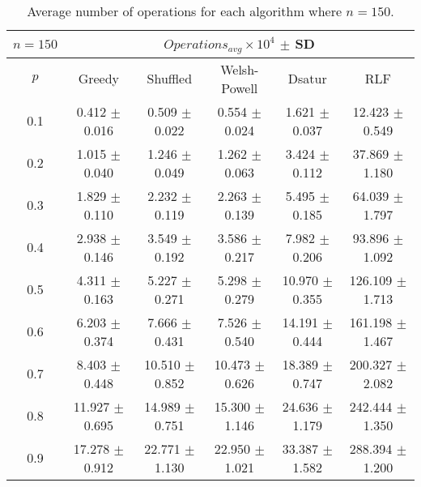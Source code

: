 \begin{table}[H]
    \centering
    \begin{tabular}{cccccc}
        
        $n = 150$& \multicolumn{5}{c}{$Operations_{avg}\times10^4$ $\pm$ SD} \\
        \hline
        $p$ & Greedy & Shuffled & Welsh-Powell & Dsatur & RLF \\
        \hline
        0.1 & 0.412 $\pm$ 0.016 & 0.509 $\pm$ 0.022 & 0.554 $\pm$ 0.024 & 1.621 $\pm$ 0.037 & 12.423 $\pm$ 0.549 \\
        0.2 & 1.015 $\pm$ 0.040 & 1.246 $\pm$ 0.049 & 1.262 $\pm$ 0.063 & 3.424 $\pm$ 0.112 & 37.869 $\pm$ 1.180 \\
        0.3 & 1.829 $\pm$ 0.110 & 2.232 $\pm$ 0.119 & 2.263 $\pm$ 0.139 & 5.495 $\pm$ 0.185 & 64.039 $\pm$ 1.797 \\
        0.4 & 2.938 $\pm$ 0.146 & 3.549 $\pm$ 0.192 & 3.586 $\pm$ 0.217 & 7.982 $\pm$ 0.206 & 93.896 $\pm$ 1.092 \\
        0.5 & 4.311 $\pm$ 0.163 & 5.227 $\pm$ 0.271 & 5.298 $\pm$ 0.279 & 10.970 $\pm$ 0.355 & 126.109 $\pm$ 1.713 \\
        0.6 & 6.203 $\pm$ 0.374 & 7.666 $\pm$ 0.431 & 7.526 $\pm$ 0.540 & 14.191 $\pm$ 0.444 & 161.198 $\pm$ 1.467 \\
        0.7 & 8.403 $\pm$ 0.448 & 10.510 $\pm$ 0.852 & 10.473 $\pm$ 0.626 & 18.389 $\pm$ 0.747 & 200.327 $\pm$ 2.082 \\
        0.8 & 11.927 $\pm$ 0.695 & 14.989 $\pm$ 0.751 & 15.300 $\pm$ 1.146 & 24.636 $\pm$ 1.179 & 242.444 $\pm$ 1.350 \\
        0.9 & 17.278 $\pm$ 0.912 & 22.771 $\pm$ 1.130 & 22.950 $\pm$ 1.021 & 33.387 $\pm$ 1.582 & 288.394 $\pm$ 1.200 \\
        \hline
    \end{tabular}
    \caption{Average number of operations for each algorithm where $n = 150$.}
    \label{tab:avgOpsforV150}
\end{table}

